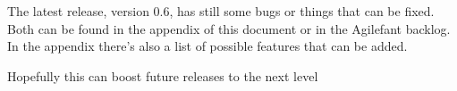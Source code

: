 The latest release, version 0.6, has still some bugs or things that can be fixed.
Both can be found in the appendix of this document or in the Agilefant backlog.
In the appendix there's also a list of possible features that can be added.


Hopefully this can boost future releases to the next level













